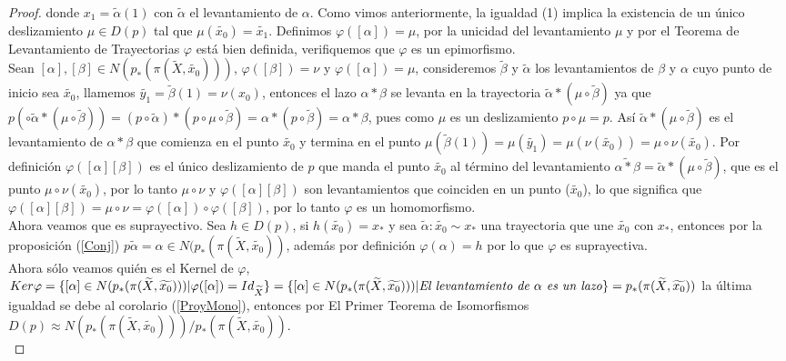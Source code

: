 \begin{proof}
donde $x_1=\widetilde{\alpha}(1)$ con $\widetilde{\alpha}$ el levantamiento de $\alpha$. Como vimos anteriormente, la igualdad (1) implica la existencia de un \'unico deslizamiento $\mu \in D(p)$ tal que 
$\mu(\widetilde{x_0})=\widetilde{x_1}$. Definimos $\varphi([\alpha])=\mu$, por la unicidad del levantamiento $\mu$ y por el Teorema de Levantamiento de Trayectorias $\varphi$ est\'a bien definida, verifiquemos que $\varphi$ es un epimorfismo.\\
Sean $[\alpha],[\beta]\in N(p_*(\pi(\widetilde{X},\widetilde{x_0})))$, $\varphi([\beta])= \nu$ y $\varphi([\alpha])= \mu$, consideremos $\widetilde{\beta}$ y $\widetilde{\alpha}$ los levantamientos de $\beta$ y $\alpha$ cuyo punto de inicio sea $\widetilde{x_0}$, llamemos $\widetilde{y_1}=\widetilde{\beta}(1)=\nu(x_0)$, entonces el lazo $\alpha * \beta$ se levanta en la trayectoria $\widetilde{\alpha} *(\mu \circ \widetilde{\beta})$ ya que 
$p (\circ \widetilde{\alpha} *(\mu \circ \widetilde{\beta}))=(p \circ \widetilde{\alpha}) *(p \circ \mu \circ \widetilde{\beta})= \alpha *( p \circ \widetilde{\beta}) = \alpha * \beta $, pues como $\mu$ es un deslizamiento $p \circ \mu = p$. As\'i $\widetilde{\alpha} *(\mu \circ \widetilde{\beta})$ es el levantamiento de $\alpha * \beta$ que comienza en el punto $\widetilde{x_0}$ y termina en el punto $\mu(\widetilde{\beta}(1))=\mu(\widetilde{y_1})=\mu(\nu(\widetilde{x_0}))= \mu \circ \nu (\widetilde{x_0})$. Por definici\'on $\varphi([\alpha][\beta])$ es el \'unico deslizamiento de $p$ que manda el punto $\widetilde{x_0}$ al t\'ermino del levantamiento 
$\widetilde{\alpha * \beta}= \widetilde{\alpha} *(\mu \circ \widetilde{\beta})$, que es el punto $\mu \circ \nu(\widetilde{x_0})$, por lo tanto $\mu \circ \nu$ y $\varphi([\alpha][\beta])$ son levantamientos que coinciden en un punto ($\widetilde{x_0}$), lo que significa que $\varphi([\alpha][\beta])=\mu \circ \nu = \varphi([\alpha]) \circ \varphi([\beta])$, por lo tanto $\varphi$ es un homomorfismo.\\

Ahora veamos que es suprayectivo. Sea $h \in D(p)$, si $h(\widetilde{x_0})= x_*$ y sea $\widetilde{\alpha}:\widetilde{x_0} \sim x_*$ una trayectoria que une $\widetilde{x_0}$ con  $x_*$, entonces por la proposici\'on (\ref{Conj}) 
$p \widetilde{\alpha} = \alpha \in N(p_*(\pi(\widetilde{X},\widetilde{x_0}))$, adem\'as por definici\'on $\varphi(\alpha)= h$ por lo que $\varphi$ es suprayectiva.\\

Ahora s\'olo veamos qui\'en es el Kernel de $\varphi$, 
$Ker\varphi=\lbrace[\alpha]\in N(p_*(\pi(\widetilde{X},\widetilde{x_0}))) \vert \varphi([\alpha])=Id_{\widetilde{X}} \rbrace = \lbrace[\alpha]\in N(p_*(\pi(\widetilde{X},\widetilde{x_0}))) \vert \hbox{{\textit{El levantamiento de $\alpha$ es un lazo}}}  \rbrace = p_*(\pi(\widetilde{X},\widetilde{x_0}))$ la \'ultima igualdad se debe al corolario (\ref{ProyMono}), entonces por El Primer Teorema de Isomorfismos $D(p) \approx N(p_*(\pi(\widetilde{X},\widetilde{x_0})))/p_*(\pi (\widetilde{X},\widetilde{x_0}))$.\\ 
\end{proof}

